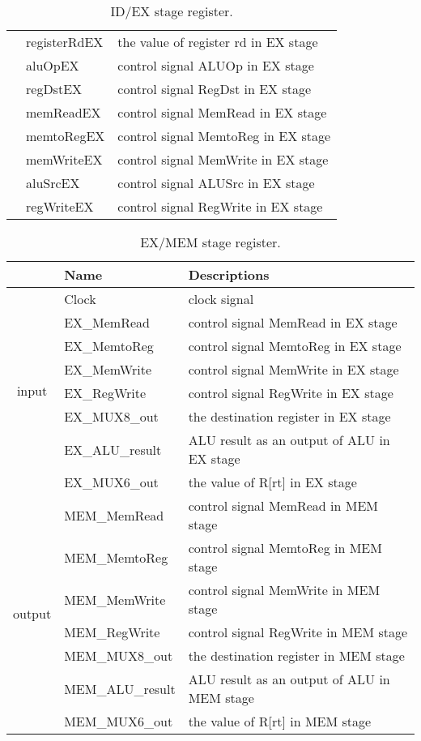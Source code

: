 \documentclass[a4paper]{article}
\begin{document}
\begin{table}[H]
\begin{tabular}{|c|l|l|}
        &registerRdEX&the value of register rd in EX stage\\
        \cline{2-3}
        &aluOpEX&control signal ALUOp in EX stage\\
        \cline{2-3}
        &regDstEX&control signal RegDst in EX stage\\
        \cline{2-3}
        &memReadEX&control signal MemRead in EX stage\\
        \cline{2-3}
        &memtoRegEX&control signal MemtoReg in EX stage\\
        \cline{2-3}
        &memWriteEX&control signal MemWrite in EX stage\\
        \cline{2-3}
        &aluSrcEX&control signal ALUSrc in EX stage\\
        \cline{2-3}
        &regWriteEX&control signal RegWrite in EX stage\\
        \hline
    \end{tabular}
    \caption{ID/EX stage register.}
\end{table}
\begin{table}[H]
    \centering
    \begin{tabular}{|c|l|l|}
        \hline
        &Name&Descriptions\\
        \hline
        \multirow{8}{*}{input}&Clock&clock signal\\
        \cline{2-3}
        &EX\_MemRead&control signal MemRead in EX stage\\
        \cline{2-3}
        &EX\_MemtoReg&control signal MemtoReg in EX stage\\
        \cline{2-3}
        &EX\_MemWrite&control signal MemWrite in EX stage\\
        \cline{2-3}
        &EX\_RegWrite&control signal RegWrite in EX stage\\
        \cline{2-3}
        &EX\_MUX8\_out&the destination register in EX stage\\
        \cline{2-3}
        &EX\_ALU\_result&ALU result as an output of ALU in EX stage\\
        \cline{2-3}
        &EX\_MUX6\_out&the value of R[rt] in EX stage\\
        \hline
        \multirow{7}{*}{output}&MEM\_MemRead&control signal MemRead in MEM stage\\
        \cline{2-3}
        &MEM\_MemtoReg&control signal MemtoReg in MEM stage\\
        \cline{2-3}
        &MEM\_MemWrite&control signal MemWrite in MEM stage\\
        \cline{2-3}
        &MEM\_RegWrite&control signal RegWrite in MEM stage\\
        \cline{2-3}
        &MEM\_MUX8\_out&the destination register in MEM stage\\
        \cline{2-3}
        &MEM\_ALU\_result&ALU result as an output of ALU in MEM stage\\
        \cline{2-3}
        &MEM\_MUX6\_out&the value of R[rt] in MEM stage\\
        \hline
    \end{tabular}
    \caption{EX/MEM stage register.}
\end{table}
\end{document}
